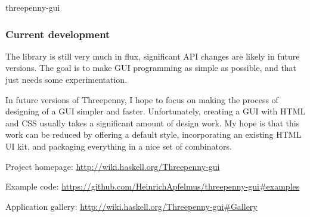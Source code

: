 \begin{hcarentry}[updated]{threepenny-gui}
\subsubsection*{Current development}

The library is still very much in flux, significant API changes are likely in future versions. The goal is to make GUI programming as simple as possible, and that just needs some experimentation.

In future versions of Threepenny, I hope to focus on making the process of designing of a GUI simpler and faster. Unfortunately, creating a GUI with HTML and CSS usually takes a significant amount of design work. My hope is that this work can be reduced by offering a default style, incorporating an existing HTML UI kit, and packaging everything in a nice set of combinators.


\FurtherReading
\begin{compactitem}
\item Project homepage: \url{http://wiki.haskell.org/Threepenny-gui}
\item Example code: \url{https://github.com/HeinrichApfelmus/threepenny-gui#examples}
\item Application gallery: \url{http://wiki.haskell.org/Threepenny-gui#Gallery}
\end{compactitem}
\end{hcarentry}
